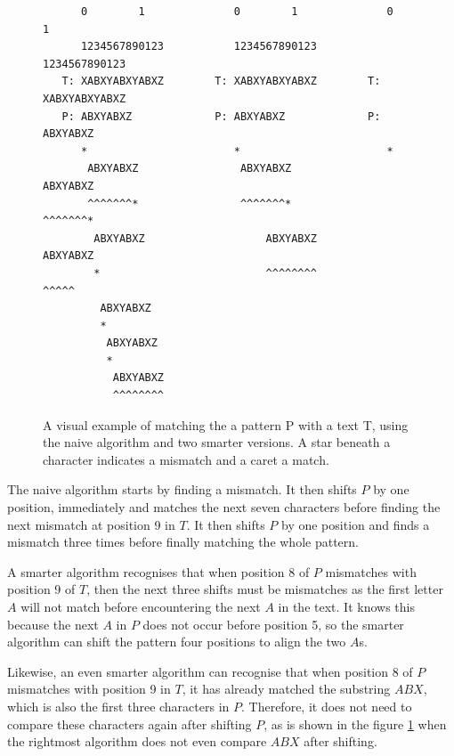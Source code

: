 \begin{figure}[t]
\begin{verbatim}
      0        1              0        1              0        1   
      1234567890123           1234567890123           1234567890123
   T: XABXYABXYABXZ        T: XABXYABXYABXZ        T: XABXYABXYABXZ
   P: ABXYABXZ             P: ABXYABXZ             P: ABXYABXZ     
      *                       *                       *            
       ABXYABXZ                ABXYABXZ                ABXYABXZ    
       ^^^^^^^*                ^^^^^^^*                ^^^^^^^*    
        ABXYABXZ                   ABXYABXZ                ABXYABXZ
        *                          ^^^^^^^^                   ^^^^^
         ABXYABXZ                                                  
         *                                                         
          ABXYABXZ                                                 
          *                                                        
           ABXYABXZ                                                
           ^^^^^^^^                                                
\end{verbatim}
    \caption{A visual example of matching the a pattern P with a text T, using the naive algorithm and two smarter versions. A star beneath a character indicates a mismatch and a caret a match. }
    \label{fig:stringmatchingexample}
\end{figure}

The naive algorithm starts by finding a mismatch. It then shifts $P$ by one position, immediately and matches the next seven characters before finding the next mismatch at position 9 in $T$. It then shifts $P$ by one position and finds a mismatch three times before finally matching the whole pattern. 

A smarter algorithm recognises that when position 8 of $P$ mismatches with position 9 of $T$, then the next three shifts must be mismatches as the first letter $A$ will not match before encountering the next $A$ in the text. It knows this because the next $A$ in $P$ does not occur before position 5, so the smarter algorithm can shift the pattern four positions to align the two $A$s. 

Likewise, an even smarter algorithm can recognise that when position 8 of $P$ mismatches with position 9 in $T$, it has already matched the substring $ABX$, which is also the first three characters in $P$. Therefore, it does not need to compare these characters again after shifting $P$, as is shown in the figure \ref{fig:stringmatchingexample} when the rightmost algorithm does not even compare $ABX$ after shifting. 


